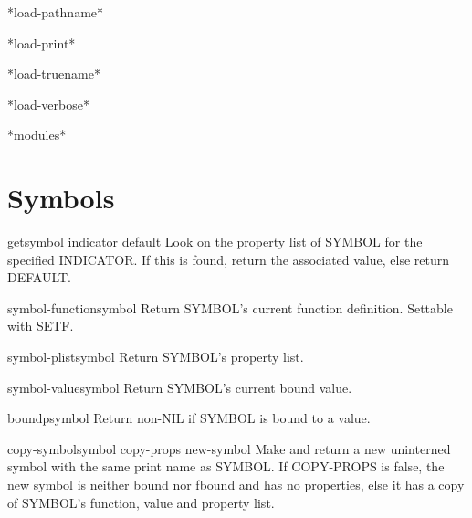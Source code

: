 \begin{variable}{*load-pathname*}{}{}{}
  
\end{variable}

\begin{variable}{*load-print*}{}{}{}
  
\end{variable}

\begin{variable}{*load-truename*}{}{}{}
  
\end{variable}

\begin{variable}{*load-verbose*}{}{}{}
  
\end{variable}

\begin{variable}{*modules*}{}{}{}
  
\end{variable}

\section{Symbols}

\begin{accessor}{get}{symbol indicator \op default}{}{}
  Look on the property list of SYMBOL for the specified INDICATOR. If this
  is found, return the associated value, else return DEFAULT.
\end{accessor}

\begin{accessor}{symbol-function}{symbol}{}{}
  Return SYMBOL's current function definition. Settable with SETF.
\end{accessor}

\begin{accessor}{symbol-plist}{symbol}{}{}
  Return SYMBOL's property list.
\end{accessor}

\begin{accessor}{symbol-value}{symbol}{}{}
  Return SYMBOL's current bound value.
\end{accessor}

\begin{function}{boundp}{symbol}{}{}
  Return non-NIL if SYMBOL is bound to a value.
\end{function}

\begin{function}{copy-symbol}{symbol \op copy-props \aux new-symbol}{}{}
  Make and return a new uninterned symbol with the same print name
  as SYMBOL. If COPY-PROPS is false, the new symbol is neither bound
  nor fbound and has no properties, else it has a copy of SYMBOL's
  function, value and property list.
\end{function}

